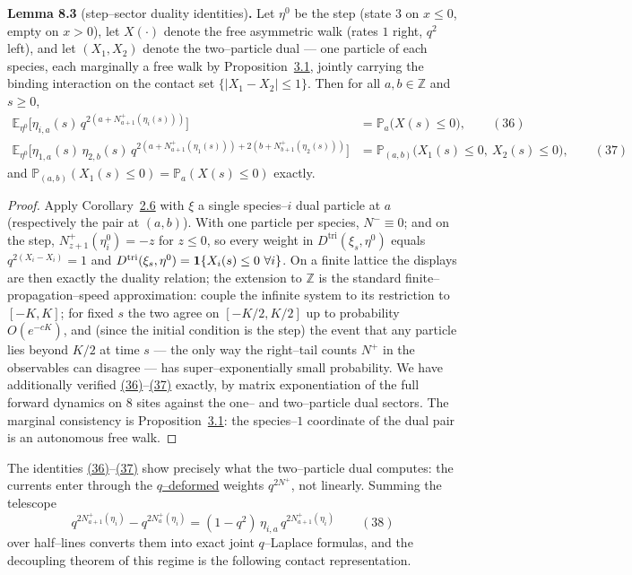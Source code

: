 \documentclass[11pt]{article}
\theoremstyle{plain}
\theoremstyle{definition}
\theoremstyle{remark}
\newcommand{\Z}{\mathbb{Z}}\newcommand{\R}{\mathbb{R}}\newcommand{\N}{\mathbb{N}}
\newcommand{\E}{\mathbb{E}}\newcommand{\PP}{\mathbb{P}}\newcommand{\dd}{\,\mathrm{d}}
\begin{document}
\label{lem_tridual}\noindent\textbf{Lemma 8.3} (step--sector duality identities)\textbf{.} 
Let $\eta^0$ be the step (state $3$ on $x\le0$, empty on $x>0$), let $X(\cdot)$ denote
the free asymmetric walk (rates $1$ right, $q^2$ left), and let $(X_1,X_2)$ denote the
two--particle dual --- one particle of each species, each marginally a free walk by
Proposition~\hyperref[prop_decouple]{3.1}, jointly carrying the binding interaction on the
contact set $\{|X_1-X_2|\le1\}$. Then for all $a,b\in\Z$ and $s\ge0$,
\label{eq_tri1}\label{eq_tri2}
\begin{align}
  \E_{\eta^0}\Big[\eta_{i,a}(s)\,q^{2\left(a+N^+_{a+1}(\eta_i(s))\right)}\Big]
   &=\PP_a\big(X(s)\le0\big),\qquad(36)\\
  \E_{\eta^0}\Big[\eta_{1,a}(s)\,\eta_{2,b}(s)\,
    q^{2\left(a+N^+_{a+1}(\eta_1(s))\right)+2\left(b+N^+_{b+1}(\eta_2(s))\right)}\Big]
   &=\PP_{(a,b)}\big(X_1(s)\le0,\ X_2(s)\le0\big),\qquad(37)\end{align}
and $\PP_{(a,b)}(X_1(s)\le0)=\PP_a(X(s)\le0)$ exactly.
\par
\begin{proof}
Apply Corollary~\hyperref[cor_tri]{2.6} with $\xi$ a single species--$i$ dual particle at $a$
(respectively the pair at $(a,b)$). With one particle per species, $N^-\equiv0$; and
on the step, $N^+_{z+1}(\eta^0_i)=-z$ for $z\le0$, so every weight in
$D^{\mathrm{tri}}(\xi_s,\eta^0)$ equals $q^{2(X_i-X_i)}=1$ and
$D^{\mathrm{tri}}(\xi_s,\eta^0)=\bone\{X_i(s)\le0\ \forall i\}$. On a finite lattice
the displays are then exactly the duality relation; the extension to $\Z$ is the
standard finite--propagation--speed approximation: couple the infinite system to its
restriction to $[-K,K]$; for fixed $s$ the two agree on $[-K/2,K/2]$ up to
probability $O(e^{-cK})$, and (since the initial condition is the step) the event
that any particle lies beyond $K/2$ at time $s$ --- the only way the right--tail
counts $N^+$ in the observables can disagree --- has super--exponentially small
probability. We
have additionally verified \hyperref[eq_tri1]{(36)}--\hyperref[eq_tri2]{(37)} exactly, by matrix
exponentiation of the full forward dynamics on $8$ sites against the one-- and
two--particle dual sectors. The marginal consistency is
Proposition~\hyperref[prop_decouple]{3.1}: the species--$1$ coordinate of the dual pair is an
autonomous free walk.
\end{proof}

The identities \hyperref[eq_tri1]{(36)}--\hyperref[eq_tri2]{(37)} show precisely what the two--particle
dual computes: the currents enter through the \underline{$q$--deformed} weights
$q^{2N^+}$, not linearly. Summing the telescope
\label{eq_telescope}
\begin{equation}
  q^{2N^+_{a+1}(\eta_i)}-q^{2N^+_{a}(\eta_i)}
  =(1-q^2)\,\eta_{i,a}\,q^{2N^+_{a+1}(\eta_i)}\qquad(38)
\end{equation}
over half--lines converts them into exact joint $q$--Laplace formulas, and the
decoupling theorem of this regime is the following contact representation.
\end{document}
